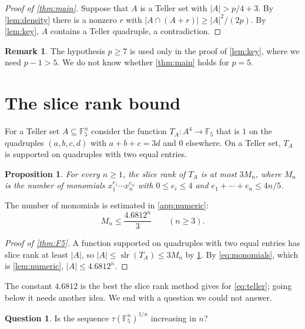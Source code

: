 \documentclass[11pt]{amsart}
\newtheorem{prop}[prop]{Proposition}
\theoremstyle{definition}
\newtheorem{rem}[thm]{Remark}
\newtheorem{question}{Question}
\numberwithin{equation}{section}
\newcommand{\F}{\mathbb{F}}
\DeclareMathOperator{\slr}{slr}
\begin{document}
\begin{proof}[Proof of \cref{thm:main}]
Suppose that $A$ is a Teller set with $|A| > p/4 + 3$. By \cref{lem:density} there is a nonzero $r$ with $|A \cap (A + r)| \geq |A|^2/(2p)$. By \cref{lem:key}, $A$ contains a Teller quadruple, a contradiction.
\end{proof}

\begin{rem}\label{rem:p5}
The hypothesis $p \geq 7$ is used only in the proof of \cref{lem:key}, where we need $p - 1 > 5$. We do not know whether \cref{thm:main} holds for $p = 5$.
\end{rem}

\section{The slice rank bound}\label{sec:slice}

For a Teller set $A \subseteq \F_5^n$ consider the function $T_A \colon A^4 \to \F_5$ that is $1$ on the quadruples $(a, b, c, d)$ with $a + b + c = 3d$ and $0$ elsewhere. On a Teller set, $T_A$ is supported on quadruples with two equal entries.

\begin{prop}\label{prop:slice}
For every $n \geq 1$, the slice rank of $T_A$ is at most $3 M_n$, where $M_n$ is the number of monomials $x_1^{e_1} \cdots x_n^{e_n}$ with $0 \leq e_i \leq 4$ and $e_1 + \cdots + e_n \leq 4n/5$.
\end{prop}

The number of monomials is estimated in \cref{app:numeric}:
\begin{equation}\label{eq:monomials}
M_n \leq \frac{4.6812^n}{3} \qquad (n \geq 3).
\end{equation}

\begin{proof}[Proof of \cref{thm:F5}]
A function supported on quadruples with two equal entries has slice rank at least $|A|$, so $|A| \leq \slr(T_A) \leq 3 M_n$ by \cref{prop:slice}. By \eqref{eq:monomials}, which is \cref{lem:numeric}, $|A| \leq 4.6812^n$.
\end{proof}

The constant $4.6812$ is the best the slice rank method gives for \eqref{eq:teller}; going below it needs another idea. We end with a question we could not answer.

\begin{question}\label{q:mono}
Is the sequence $\tau(\F_5^n)^{1/n}$ increasing in $n$?
\end{question}
\end{document}
